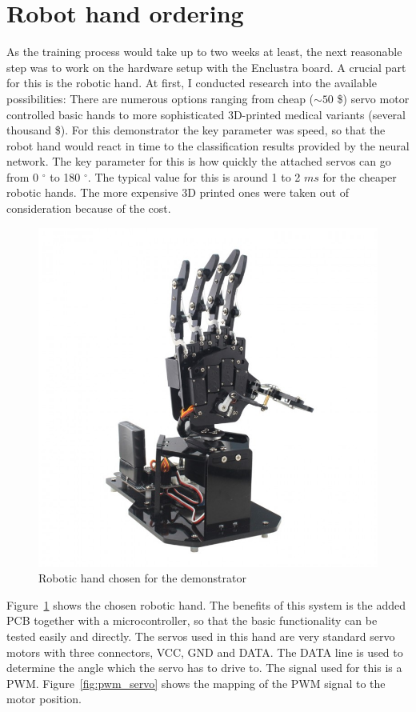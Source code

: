 \section{Robot hand ordering}
As the training process would take up to two weeks at least, the next reasonable step was to work on the hardware setup with the Enclustra board. A crucial part for this is the robotic hand. At first, I conducted research into the available possibilities: There are numerous options ranging from cheap ($\sim 50$ \$) servo motor controlled basic hands to more sophisticated 3D-printed medical variants (several thousand \$). For this demonstrator the key parameter was speed, so that the robot hand would react in time to the classification results provided by the neural network. The key parameter for this is how quickly the attached servos can go from 0 $^\circ$ to 180 $^\circ$. The typical value for this is around 1 to 2 $ms$ for the cheaper robotic hands. The more expensive 3D printed ones were taken out of consideration because of the cost.
\begin{figure}[!htb]
	\centering
		\includegraphics[width=\textwidth]{bilder/robohand.jpg}
		\caption{Robotic hand chosen for the demonstrator}
		\label{fig:robohand}
\end{figure}
Figure~\ref{fig:robohand} shows the chosen robotic hand. The benefits of this system is the added \ac{PCB} together with a microcontroller, so that the basic functionality can be tested easily and directly. The servos used in this hand are very standard servo motors with three connectors, VCC, GND and DATA. The DATA line is used to determine the angle which the servo has to drive to. The signal used for this is a \ac{PWM}. Figure~\ref{fig:pwm_servo} shows the mapping of the \ac{PWM} signal to the motor position.
